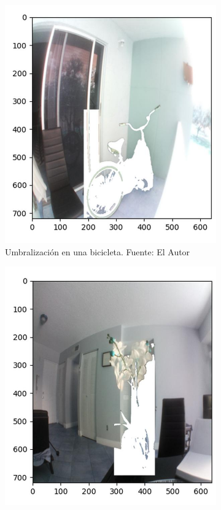 \begin{figure}[H]
     \centering
     \begin{subfigure}[b]{0.4\textwidth}
        \centering
        \includegraphics[scale=0.35]{Recursos/otsu_bike.jpg}
        \caption[Umbralización en una bicicleta.]{Umbralización en una bicicleta. {\footnotesize Fuente: El Autor}}
        \label{otsu_bike}
     \end{subfigure}
     \hfill
     \begin{subfigure}[b]{0.4\textwidth}
        \centering
        \includegraphics[scale=0.35]{Recursos/otsu_position.jpg}

\end{subfigure}
\end{figure}

